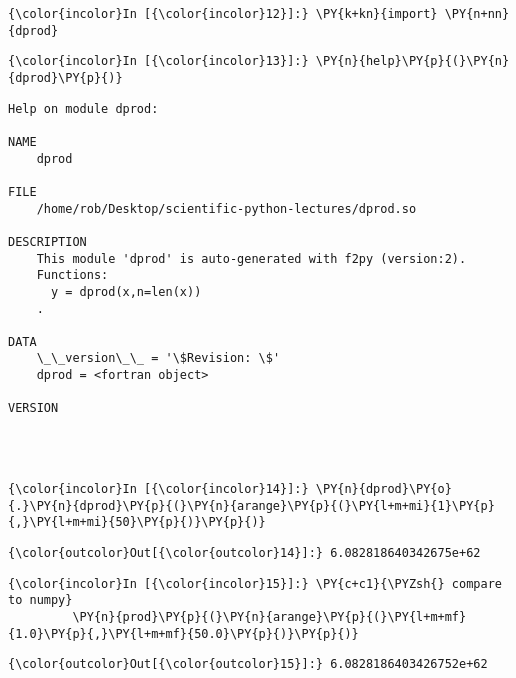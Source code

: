     \begin{Verbatim}[commandchars=\\\{\}]
{\color{incolor}In [{\color{incolor}12}]:} \PY{k+kn}{import} \PY{n+nn}{dprod}
\end{Verbatim}

    \begin{Verbatim}[commandchars=\\\{\}]
{\color{incolor}In [{\color{incolor}13}]:} \PY{n}{help}\PY{p}{(}\PY{n}{dprod}\PY{p}{)}
\end{Verbatim}

    \begin{Verbatim}[commandchars=\\\{\}]
Help on module dprod:

NAME
    dprod

FILE
    /home/rob/Desktop/scientific-python-lectures/dprod.so

DESCRIPTION
    This module 'dprod' is auto-generated with f2py (version:2).
    Functions:
      y = dprod(x,n=len(x))
    .

DATA
    \_\_version\_\_ = '\$Revision: \$'
    dprod = <fortran object>

VERSION




    \end{Verbatim}

    \begin{Verbatim}[commandchars=\\\{\}]
{\color{incolor}In [{\color{incolor}14}]:} \PY{n}{dprod}\PY{o}{.}\PY{n}{dprod}\PY{p}{(}\PY{n}{arange}\PY{p}{(}\PY{l+m+mi}{1}\PY{p}{,}\PY{l+m+mi}{50}\PY{p}{)}\PY{p}{)}
\end{Verbatim}

            \begin{Verbatim}[commandchars=\\\{\}]
{\color{outcolor}Out[{\color{outcolor}14}]:} 6.082818640342675e+62
\end{Verbatim}
        
    \begin{Verbatim}[commandchars=\\\{\}]
{\color{incolor}In [{\color{incolor}15}]:} \PY{c+c1}{\PYZsh{} compare to numpy}
         \PY{n}{prod}\PY{p}{(}\PY{n}{arange}\PY{p}{(}\PY{l+m+mf}{1.0}\PY{p}{,}\PY{l+m+mf}{50.0}\PY{p}{)}\PY{p}{)}
\end{Verbatim}

            \begin{Verbatim}[commandchars=\\\{\}]
{\color{outcolor}Out[{\color{outcolor}15}]:} 6.0828186403426752e+62
\end{Verbatim}
        
